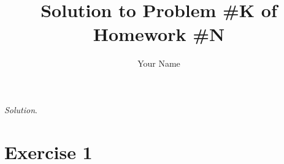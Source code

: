 \documentclass[12pt]{article}
\title{Solution to Problem \#K of Homework \#N}
\author{Your Name}
\begin{document}
\maketitle
\thispagestyle{fancyplain}
\flushleft

{\it Solution}.\par
\smallskip


\section{Exercise 1}


\end{document}
